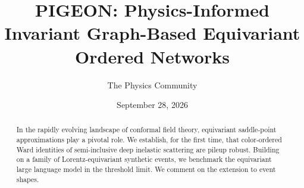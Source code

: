 \documentclass[11pt]{article}
\title{PIGEON: Physics-Informed Invariant Graph-Based Equivariant Ordered Networks}
\author{The Physics Community}
\date{September 28, 2026}
\numberwithin{equation}{section}
\theoremstyle{definition}
\theoremstyle{remark}
\begin{document}
\maketitle
\begin{abstract}
In the rapidly evolving landscape of conformal field theory, equivariant
saddle-point approximations play a pivotal role. We establish, for the
first time, that color-ordered Ward identities of semi-inclusive deep
inelastic scattering are pileup robust. Building on a family of
Lorentz-equivariant synthetic events, we benchmark the equivariant large
language model in the threshold limit. We comment on the extension to
event shapes.
\end{abstract}
\tableofcontents






\nocite{*}


\end{document}
